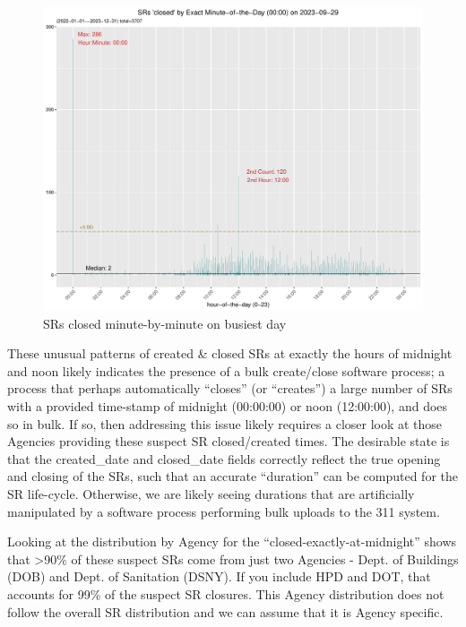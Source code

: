 \documentclass[12pt, titlepage]{article}
\begin{document}
{ 	\begin{figure}[H]
		 \centering
		 \includegraphics[width=\textwidth]{SR_closed_by_minute_of_busiest_day.pdf}
		 \caption{SRs closed minute-by-minute on busiest day}
		 \label{fig:busiestclosed}
	\end{figure}	

	These unusual patterns of created \& closed SRs at exactly the hours of midnight and noon likely indicates
	the presence of a bulk create/close software process; a process that perhaps automatically ``closes'' (or ``creates'') 
	a large number of SRs with a provided time-stamp of midnight (00:00:00) or noon (12:00:00), and does so in bulk. 
	If so, then addressing this issue likely requires a closer look at those Agencies providing these suspect SR closed/created times.
	 The desirable state is that the created\_date and closed\_date fields correctly reflect the true opening and closing 
	 of the SRs, such that an accurate ``duration'' can be computed for the SR life-cycle. Otherwise, we are likely seeing 
	 durations that are artificially manipulated by a software process performing bulk uploads to the 311 system.

	Looking at the distribution by Agency for the ``closed-exactly-at-midnight'' shows that \textgreater{}90\% of these suspect SRs come from just two Agencies - Dept. of 
	Buildings (DOB) and Dept. of Sanitation (DSNY). If you include HPD and DOT, that accounts for 99\% of the suspect SR closures. This Agency
	distribution does not follow the overall SR distribution and we can assume that it is Agency specific. 

}
\end{document}
